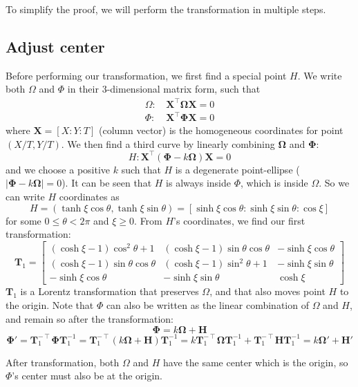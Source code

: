 \documentclass[]{article}
\begin{document}
To simplify the proof, we will perform the transformation in multiple steps.

\subsection{Adjust center}
Before performing our transformation, we first find a special point $H$. We write both $\Omega$ and $\Phi$ in their 3-dimensional matrix form, such that
\begin{align*}
\Omega:&\, \mathbf{X}^{\intercal} \mathbf{\Omega} \mathbf{X} = 0\\
\Phi:&\, \mathbf{X}^{\intercal} \mathbf{\Phi} \mathbf{X} = 0
\end{align*}
where $\mathbf{X} = [X : Y : T]$ (column vector) is the homogeneous coordinates for point $(X/T, Y/T)$. We then find a third curve by linearly combining $\mathbf{\Omega}$ and $\mathbf{\Phi}$:
\[
H: \mathbf{X}^{\intercal} (\mathbf{\Phi} - k\mathbf{\Omega})  \mathbf{X} = 0
\]
and we choose a positive $k$ such that $H$ is a degenerate point-ellipse ($|\mathbf{\Phi} - k\mathbf{\Omega}| = 0$). It can be seen that $H$ is always inside $\Phi$, which is inside $\Omega$. So we can write $H$ coordinates as 
\[
H = (\tanh\xi\cos\theta, \tanh\xi\sin\theta) = [\sinh\xi\cos\theta:\sinh\xi\sin\theta:\cos\xi]
\]
for some $0\le\theta<2\pi$ and $\xi\ge 0$. From $H$'s coordinates, we find our first transformation:
\[
\mathbf{T}_1 = \left[\begin{matrix}
(\cosh\xi - 1)\cos^2\theta + 1 & (\cosh\xi - 1)\sin\theta\cos\theta & -\sinh\xi\cos\theta\\
(\cosh\xi - 1)\sin\theta\cos\theta & (\cosh\xi - 1)\sin^2\theta + 1 &  -\sinh\xi\sin\theta\\
-\sinh\xi\cos\theta &  -\sinh\xi\sin\theta & \cosh\xi
\end{matrix}\right]
\]
$\mathbf{T}_1$ is a Lorentz transformation that preserves $\Omega$, and that also moves point $H$ to the origin. Note that $\Phi$ can also be written as the linear combination of $\Omega$ and $H$, and remain so after the transformation:
\[
\mathbf{\Phi} = k\mathbf{\Omega} + \mathbf{H}
\]
\[
\mathbf{\Phi}' = \mathbf{T}_1^{-\intercal}\mathbf{\Phi}\mathbf{T}_1^{-1} = \mathbf{T}_1^{-\intercal}(k\mathbf{\Omega} + \mathbf{H})\mathbf{T}_1^{-1} = k\mathbf{T}_1^{-\intercal}\mathbf{\Omega}\mathbf{T}_1^{-1} + \mathbf{T}_1^{-\intercal}\mathbf{H}\mathbf{T}_1^{-1} = k\mathbf{\Omega}' + \mathbf{H}'
\]

 After transformation, both $\Omega$ and $H$ have the same center which is the origin, so $\Phi$'s center must also be at the origin.
\end{document}

